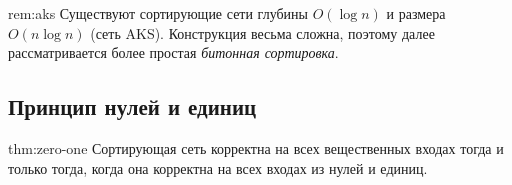 \begin{Remark}{}{rem:aks}
	Существуют сортирующие сети глубины $O(\log n)$ и размера $O(n\log n)$ (сеть AKS).
	Конструкция весьма сложна, поэтому далее рассматривается более простая \emph{битонная сортировка}.
\end{Remark}

\subsection{Принцип нулей и единиц}

\begin{Theorem}{}{thm:zero-one}
	Сортирующая сеть корректна на всех вещественных входах тогда и только тогда, когда она корректна на всех входах из нулей и единиц.
\end{Theorem}

